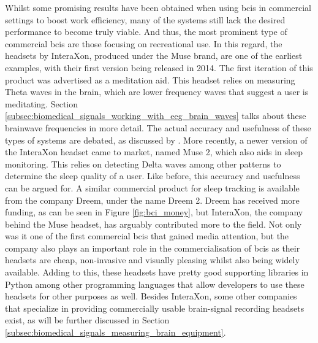 Whilst some promising results have been obtained when using \glspl{bci} in commercial settings to boost work efficiency, many of the systems still lack the desired performance to become truly viable. 
And thus, the most prominent type of commercial \glspl{bci} are those focusing on recreational use.
In this regard, the headsets by InteraXon, produced under the Muse brand, are one of the earliest examples, with their first version being released in 2014.
The first iteration of this product was advertised as a meditation aid.
This headset relies on measuring Theta waves in the brain, which are lower frequency waves that suggest a user is meditating.
Section \ref{subsec:biomedical_signals_working_with_eeg_brain_waves} talks about these brainwave frequencies in more detail.
The actual accuracy and usefulness of these types of systems are debated, as discussed by \citet{interaxon_tests}.
More recently, a newer version of the InteraXon headset came to market, named Muse 2, which also aids in sleep monitoring.
This relies on detecting Delta waves among other patterns to determine the sleep quality of a user.
Like before, this accuracy and usefulness can be argued for.
A similar commercial product for sleep tracking is available from the company Dreem, under the name Dreem 2.
Dreem has received more funding, as can be seen in Figure \ref{fig:bci_money}, but InteraXon, the company behind the Muse headset, has arguably contributed more to the field.
Not only was it one of the first commercial \glspl{bci} that gained media attention, but the company also plays an important role in the commercialisation of \glspl{bci} as their headsets are cheap, non-invasive and visually pleasing whilst also being widely available. 
Adding to this, these headsets have pretty good supporting libraries in Python among other programming languages that allow developers to use these headsets for other purposes as well.
Besides InteraXon, some other companies that specialize in providing commercially usable brain-signal recording headsets exist, as will be further discussed in Section \ref{subsec:biomedical_signals_measuring_brain_equipment}.

